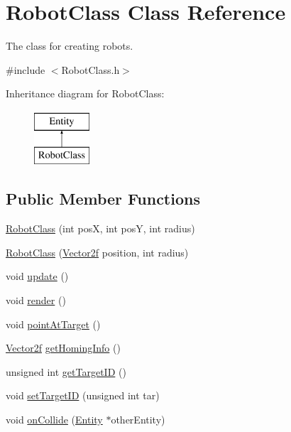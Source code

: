\hypertarget{classRobotClass}{\section{Robot\-Class Class Reference}
\label{classRobotClass}
}


The class for creating robots.  




{\ttfamily \#include $<$Robot\-Class.\-h$>$}

Inheritance diagram for Robot\-Class\-:\begin{figure}[H]
\begin{center}
\leavevmode
\includegraphics[height=2.000000cm]{classRobotClass}
\end{center}
\end{figure}
\subsection*{Public Member Functions}
\begin{DoxyCompactItemize}
\item 
\hyperlink{classRobotClass_a66fe919002ecfe53bb9ad55d7caf2279}{Robot\-Class} (int pos\-X, int pos\-Y, int radius)
\item 
\hyperlink{classRobotClass_a339a2ae3a897461d74684a3d6eea7f44}{Robot\-Class} (\hyperlink{classVector2}{Vector2f} position, int radius)
\item 
void \hyperlink{classRobotClass_a1d4d22f50854bf62af206d71f25c2a52}{update} ()
\item 
void \hyperlink{classRobotClass_a739de3580edf634c29e1185364d96d32}{render} ()
\item 
void \hyperlink{classRobotClass_ab1fe4c11b2a955eaa637024e2491175d}{point\-At\-Target} ()
\item 
\hyperlink{classVector2}{Vector2f} \hyperlink{classRobotClass_a22775cc6158313ff74cda99310852211}{get\-Homing\-Info} ()
\item 
unsigned int \hyperlink{classRobotClass_ab34379c68e43d4cad881b5ba269d1826}{get\-Target\-I\-D} ()
\item 
void \hyperlink{classRobotClass_aba077e1da8fda4565fe177886459f0e7}{set\-Target\-I\-D} (unsigned int tar)
\item 
void \hyperlink{classRobotClass_a84067f1a5a37b6a7113032e08daad9f2}{on\-Collide} (\hyperlink{classEntity}{Entity} $\ast$other\-Entity)
\end{DoxyCompactItemize}
